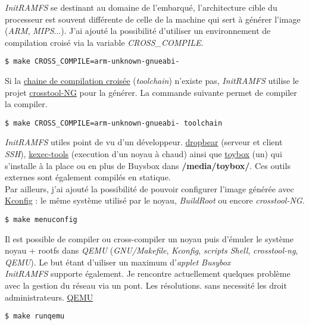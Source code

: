 \documentclass[a4paper]{article}
\begin{document}
\textit{InitRAMFS} se destinant au domaine de l'embarqué, l'architecture cible du processeur est souvent différente de celle de la machine qui sert à générer l'image (\textit{ARM}, \textit{MIPS}...). J'ai ajouté la possibilité d'utiliser un environnement de compilation croisé via la variable \textit{CROSS\_COMPILE}.
\begin{verbatim}
$ make CROSS_COMPILE=arm-unknown-gnueabi-
\end{verbatim}

Si la \href{https://fr.wikipedia.org/wiki/Cha\%C3\%AEne_de_compilation}{chaine de compilation croisée} (\textit{toolchain}) n'existe pas, \textit{InitRAMFS} utilise le projet \href{http://crosstool-ng.org/}{crosstool-NG} pour la générer. La commande suivante permet de compiler la compiler.
\begin{verbatim}
$ make CROSS_COMPILE=arm-unknown-gnueabi- toolchain
\end{verbatim}

\textit{InitRAMFS} utiles point de vu d'un développeur.
\href{https://matt.ucc.asn.au/dropbear/dropbear.html}{dropbear} (serveur et client \textit{SSH}), \href{http://git.kernel.org/cgit/utils/kernel/kexec/kexec-tools.git/}{kexec-tools} (execution d'un noyau à chaud) ainsi que \href{http://landley.net/toybox/}{toybox} (un) qui s'installe à la place ou en plus de Buysbox dans \textbf{/media/toybox/}. Ces outils externes sont également compilés en statique.\\

Par ailleurs, j'ai ajouté la possibilité de pouvoir configurer l'image générée avec \href{http://ymorin.is-a-geek.org/projects/kconfig-frontends}{Kconfig} : le même système utilisé par le noyau, \textit{BuildRoot} ou encore \textit{crosstool-NG}.
\begin{verbatim}
$ make menuconfig
\end{verbatim}

Il est possible de compiler ou cross-compiler un noyau puis d'émuler le système noyau + rootfs dans \textit{QEMU} (\textit{GNU/Makefile}, \textit{Kconfig}, \textit{scripts Shell}, \textit{crosstool-ng}, \textit{QEMU}).
Le but étant d'uiliser un maximum d'\textit{applet Busybox}\\

\textit{InitRAMFS} supporte également. Je rencontre actuellement quelques problème avec la gestion du réseau via un pont. Les résolutions. sans necessité les droit administrateurs.
\href{http://wiki.qemu.org}{QEMU}
\begin{verbatim}
$ make runqemu
\end{verbatim}
\end{document}
